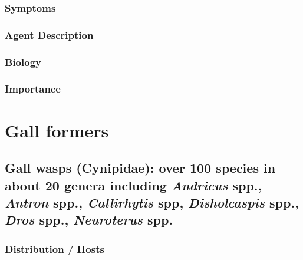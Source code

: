 \documentclass[
]{book}
\begin{document}
\subsection*{Symptoms}\label{symptoms-6}

\subsection*{Agent Description}\label{agent-description-6}

\subsection*{Biology}\label{biology-6}

\subsection*{Importance}\label{importance-6}

\chapter*{Gall formers}\label{gall-formers}

\section*{\texorpdfstring{Gall wasps (Cynipidae): over 100 species in about 20 genera including \emph{Andricus} spp., \emph{Antron} spp., \emph{Callirhytis} spp, \emph{Disholcaspis} spp., \emph{Dros} spp., \emph{Neuroterus} spp.}{Gall wasps (Cynipidae): over 100 species in about 20 genera including Andricus spp., Antron spp., Callirhytis spp, Disholcaspis spp., Dros spp., Neuroterus spp.}}\label{gall-wasps-cynipidae-over-100-species-in-about-20-genera-including-andricus-spp.-antron-spp.-callirhytis-spp-disholcaspis-spp.-dros-spp.-neuroterus-spp.}

\subsection*{Distribution / Hosts}\label{distribution-hosts-7}
\end{document}
